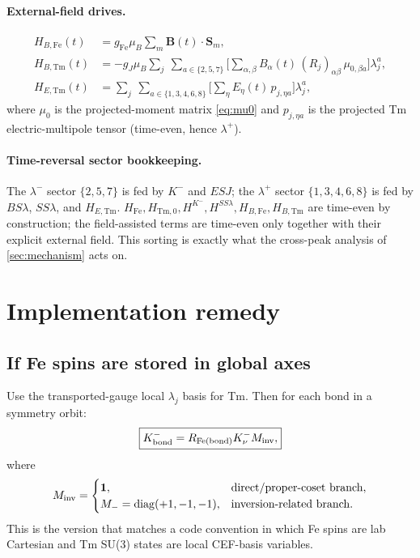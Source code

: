 \documentclass[11pt,a4paper]{article}
\newcommand{\Fe}{\mathrm{Fe}}
\newcommand{\Tm}{\mathrm{Tm}}
\newcommand{\diag}{\mathrm{diag}}
\newcommand{\ve}[1]{\boldsymbol{#1}}
\begin{document}
\paragraph{External-field drives.}
\begin{align}
  H_{B,\Fe}(t)&=g_{\Fe}\mu_B\sum_m\ve B(t)\cdot\ve S_m, \\
  H_{B,\Tm}(t)&=-g_J\mu_B\sum_{j}\ \sum_{a\in\{2,5,7\}}
    \Big[\sum_{\alpha,\beta}B_\alpha(t)\,(R_j)_{\alpha\beta}\,\mu_{0,\beta a}\Big]\lambda_j^a, \\
  H_{E,\Tm}(t)&=\sum_{j}\ \sum_{a\in\{1,3,4,6,8\}}
    \Big[\sum_\eta E_\eta(t)\,p_{j,\eta a}\Big]\lambda_j^a,
\end{align}
where $\mu_0$ is the projected-moment matrix \eqref{eq:mu0} and $p_{j,\eta a}$
is the projected Tm electric-multipole tensor (time-even, hence $\lambda^+$).

\paragraph{Time-reversal sector bookkeeping.}
The $\lambda^-$ sector $\{2,5,7\}$ is fed by $K^-$ and $ESJ$; the $\lambda^+$
sector $\{1,3,4,6,8\}$ is fed by $BS\lambda$, $SS\lambda$, and $H_{E,\Tm}$.
$H_\Fe,H_{\Tm,0},H^{K^-},H^{SS\lambda},H_{B,\Fe},H_{B,\Tm}$ are time-even by
construction; the field-assisted terms are time-even only together with their
explicit external field.  This sorting is exactly what the cross-peak analysis
of \cref{sec:mechanism} acts on.


\section{Implementation remedy}

\subsection{If Fe spins are stored in global axes}

Use the transported-gauge local $\lambda_j$ basis for Tm.  Then for each bond in a symmetry orbit:
\begin{equation}
  \boxed{
  K_{\rm bond}^-=R_{\Fe({\rm bond})}K_\nu^-M_{\rm inv},}
\end{equation}
where
\begin{equation}
  M_{\rm inv}=\begin{cases}
    \mathbf 1, & \text{direct/proper-coset branch},\\
    M_- = \diag(+1,-1,-1), & \text{inversion-related branch}.
  \end{cases}
\end{equation}
This is the version that matches a code convention in which Fe spins are lab Cartesian and Tm SU(3) states are local CEF-basis variables.
\end{document}
